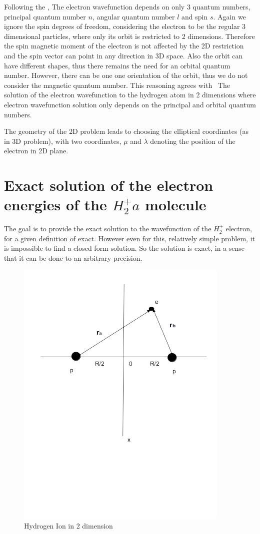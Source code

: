 Following the \cite{2DHAtom}, The electron wavefunction depends on only 3 quantum numbers, principal quantum number $ n $, angular quantum number $ l $ and spin $ s $. Again we ignore the spin degrees of freedom, considering the electron to be the regular 3 dimensional particles, where only its orbit is restricted to 2 dimensions.  Therefore the spin magnetic moment of the electron is not affected by the 2D restriction and the spin vector can point in any direction in 3D space. Also the orbit can have different shapes, thus there remains the need for an orbital quantum number. However, there can be one one orientation of the orbit, thus we do not consider the magnetic quantum number. This reasoning agrees with ~The solution of the electron wavefunction to the hydrogen atom in 2 dimensions \cite{H2atom} where electron wavefunction solution only depends on the principal and orbital quantum numbers.

The geometry of the 2D problem leads to choosing the elliptical coordinates (as in 3D problem), with two coordinates, $ \mu $ and $ \lambda $ denoting the position of the electron in 2D plane. \cite{Arfken}

\section{Exact solution of the electron energies of the \texorpdfstring{$ H_2^+ a$}{H2+} molecule}

The goal is to provide the exact solution to the wavefunction of the $ H_2^{+} $ electron, for a given definition of exact. However even for this, relatively simple problem, it is impossible to find a closed form solution. So the solution is exact, in a sense that it can be done to an arbitrary precision.

\begin{figure}
 \captionsetup{type=figure}
  \includegraphics{H2Ion2D.png}
  \caption{Hydrogen Ion in 2 dimension} 
  \label{h2ion2d}
\end{figure}

